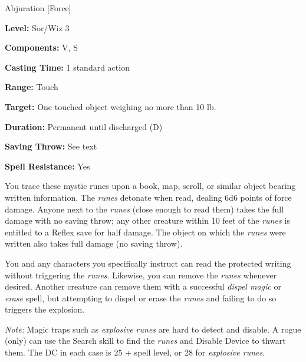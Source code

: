 
Abjuration [Force]

\textbf{Level:} Sor/Wiz 3

\textbf{Components:} V, S

\textbf{Casting Time:} 1 standard action

\textbf{Range:} Touch

\textbf{Target:} One touched object weighing no more than 10 lb.

\textbf{Duration:} Permanent until discharged (D)

\textbf{Saving Throw:} See text

\textbf{Spell Resistance:} Yes

You trace these mystic runes upon a book, map, scroll, or similar object bearing 
written information. The \textit{runes} detonate when read, dealing 6d6 points 
of force damage. Anyone next to the \textit{runes} (close enough to read them) 
takes the full damage with no saving throw; any other creature within 10 feet of 
the \textit{runes} is entitled to a Reflex save for half damage. The object on 
which the \textit{runes} were written also takes full damage (no saving throw).

You and any characters you specifically instruct can read the protected writing 
without triggering the \textit{runes}. Likewise, you can remove the \textit{runes 
}whenever desired. Another creature can remove them with a successful \textit{dispel 
magic} or \textit{erase} spell, but attempting to dispel or erase the \textit{runes 
}and failing to do so triggers the explosion.

\textit{Note:} Magic traps such as \textit{explosive runes} are hard to detect 
and disable. A rogue (only) can use the Search skill to find the \textit{runes 
}and Disable Device to thwart them. The DC in each case is 25 + spell level, or 
28 for \textit{explosive runes}.

